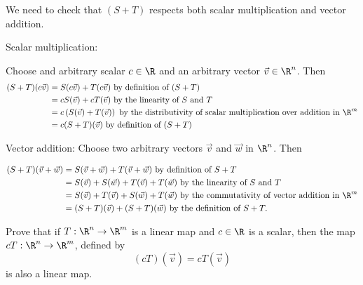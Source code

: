 \documentclass{ximera}
\begin{document}
\begin{free-response} 
 We need to check that $(S+T)$ respects both scalar multiplication and vector addition.
 
 Scalar multiplication:
 
 Choose and arbitrary scalar $c \in \R$ and an arbitrary vector $\vec{v} \in \R^n$.  Then
 	\begin{align*}
 	(S+T)(c\vec{v}) &=S(c\vec{v})+T(c\vec{v}) \text{ by definition of } (S+T)\\
 	&= cS(\vec{v})+cT(\vec{v}) \text{ by the linearity of } S \text{ and } T\\
 	&=c\left( S(\vec{v}) + T(\vec{v})\right) \text{ by the distributivity of scalar multiplication over addition in } \R^m\\
 	&=c(S+T)(\vec{v}) \text{ by definition of } (S+T)
 	\end{align*}
 	
 	Vector addition:
 	Choose two arbitrary vectors $\vec{v}$ and $\vec{w}$ in $\R^n$.  Then
 	
 	\begin{align*}
 		(S+T)(\vec{v} +\vec{w}) &= S(\vec{v}+\vec{w})+T(\vec{v}+\vec{w}) \text{ by definition of } S+T\\
 		&= S(\vec{v})+S(\vec{w})+T(\vec{v})+T(\vec{w}) \text{ by the linearity of } S \text{ and } T\\
 		&= S(\vec{v})+T(\vec{v}) + S(\vec{w})+T(\vec{w}) \text{ by the commutativity of vector addition in } \R^m\\
 		&=(S+T)(\vec{v})+(S+T)(\vec{w}) \text{ by the definition of } S+T.
 	\end{align*}
\end{free-response}



Prove that if $T:\R^n \to \R^m$ is a linear map and $c \in \R$ is a scalar, then the map $cT:\R^n \to \R^m$,  defined by 
\[(cT)(\vec{v}) = cT(\vec{v})\] is also a linear map.
  
\end{document}
